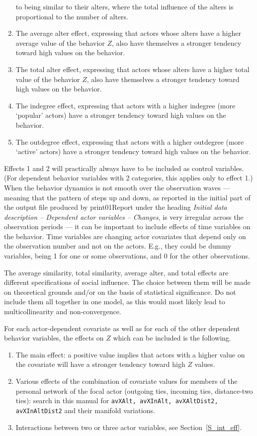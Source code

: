 \documentclass[a4paper,fleqn,11pt]{article}
\newcommand{\+}{\, + \,}
\newcommand{\sfn}[1]{\textsf{#1}}
\begin{document}
\begin{enumerate}
      to being similar to their alters,
      where the total influence of the alters is proportional to
      the number of alters.
\item The average alter effect, expressing that actors
      whose alters have a higher average value of the behavior $Z$,
      also have themselves a stronger tendency toward high values on the behavior.
\item The total alter effect, expressing that actors
      whose alters have a higher total value of the behavior $Z$,
      also have themselves a stronger tendency toward high values on the behavior.
\item The indegree effect, expressing that actors with a higher indegree
      (more `popular' actors) have a stronger tendency toward high values on the behavior.
\item The outdegree effect, expressing that actors with a higher outdegree
      (more `active' actors) have a stronger tendency toward high values on the behavior.
\end{enumerate}
Effects 1 and 2 will practically always have to be included as control variables.
(For dependent behavior variables with 2 categories, this applies only to effect 1.)
When the behavior dynamics is not smooth over the observation waves --- meaning that
the pattern of steps up and down, as reported in the initial part of the
output file produced by \sfn{print01Report}
under the heading \emph{Initial data description -- Dependent actor variables -- Changes},
is very irregular across the observation periods --- it can be important to include
effects of time variables on the behavior.
Time variables are changing actor covariates that depend only on the
observation number and not on the actors. E.g., they could be dummy variables, being 1
for one or some observations, and 0 for the other observations.

The average similarity, total similarity, average alter, and total effects
are different specifications of social influence.
The choice between them will be made on theoretical grounds
and/or on the basis of statistical significance.
Do not include them all together in one model, as this would most likely
lead to multicollinearity and non-convergence.
\medskip

For each actor-dependent covariate as well as for each of the other
dependent behavior variables,
the effects on $Z$ which can be included is the following.
\begin{enumerate}
\item The main effect: a positive value implies that actors with a
      higher value on the covariate will have a stronger tendency
      toward high $Z$ values.
\item Various effects of the combination of covariate values for members
      of the personal network of the focal actor (outgoing ties, incoming
      ties, distance-two ties): search in this manual for \texttt{avXAlt,
      avXInAlt, avXAltDist2, avXInAltDist2} and their manifold variations.
\item Interactions between two or three actor variables, see
      Section~\ref{S_int_eff}.
\end{enumerate}
\end{document}
